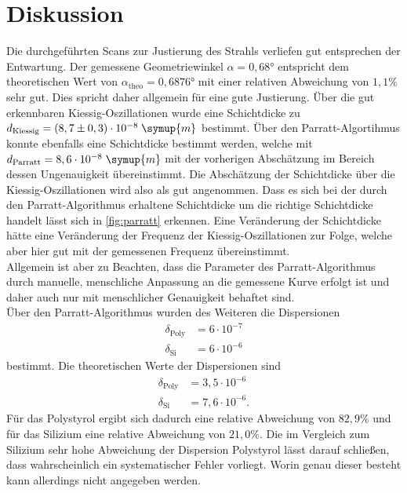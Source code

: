 \section{Diskussion}
Die durchgeführten Scans zur Justierung des Strahls verliefen gut entsprechen der Entwartung.
Der gemessene Geometriewinkel $\alpha = 0,68°$ entspricht dem theoretischen Wert von 
$\alpha_{\text{theo}} = 0,6876°$ mit einer relativen Abweichung von $1,1\%$ sehr gut.
Dies spricht daher allgemein für eine gute Justierung.
Über die gut erkennbaren Kiessig-Oszillationen wurde eine Schichtdicke zu
$d_{\text{Kiessig}} =(8,7 \pm 0,3)\cdot 10^{-8} \; \symup{m} $ bestimmt. Über den Parratt-Algortihmus 
konnte ebenfalls eine Schichtdicke bestimmt werden, welche mit 
$ d_{\text{Parratt}} = 8,6 \cdot 10^{-8} \;\symup{m}$ mit der vorherigen
Abschätzung im Bereich dessen Ungenauigkeit übereinstimmt. Die Abschätzung der Schichtdicke über die Kiessig-Oszillationen
wird also als gut angenommen. Dass es sich bei der durch den Parratt-Algorithmus erhaltene
Schichtdicke um die richtige Schichtdicke handelt lässt sich in \autoref{fig:parratt} erkennen.
Eine Veränderung der Schichtdicke hätte eine Veränderung der Frequenz der Kiessig-Oszillationen
zur Folge, welche aber hier gut mit der gemessenen Frequenz übereinstimmt. \\
Allgemein ist aber zu Beachten, dass die Parameter des Parratt-Algorithmus durch manuelle,
menschliche Anpassung an die gemessene Kurve erfolgt ist und daher auch nur mit menschlicher 
Genauigkeit behaftet sind.\\
Über den Parratt-Algorithmus wurden des Weiteren die Dispersionen
\begin{align*}
    \delta_{\text{Poly}} &= 6 \cdot 10^{-7} \\
    \delta_{\text{Si}} &= 6 \cdot 10^{-6}
\end{align*}
bestimmt.
Die theoretischen Werte \cite{tolan} der Dispersionen sind 
\begin{align*}
    \delta_{\text{Poly}} &= 3,5 \cdot 10^{-6} \\
    \delta_{\text{Si}} &= 7,6 \cdot 10^{-6}.
\end{align*}
Für das Polystyrol ergibt sich dadurch eine relative Abweichung von $82,9 \%$ und 
für das Silizium eine relative Abweichung von $21,0\%$. Die im Vergleich zum Silizium sehr 
hohe Abweichung der Dispersion Polystyrol lässt darauf schließen, dass wahrscheinlich ein 
systematischer Fehler vorliegt. Worin genau dieser besteht kann allerdings nicht angegeben werden.\\
